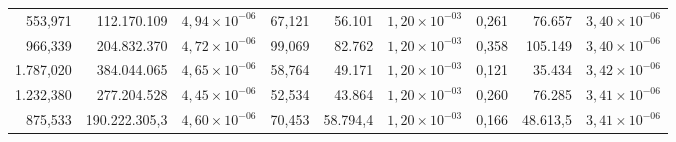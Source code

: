 \begin{table}[h]
\begin{tabular}{r r r r r r r r r}
      553,971 & 112.170.109   & $4,94 {\times} 10^{-06}$ & 67,121 & 56.101   & $1,20 {\times} 10^{-03}$ & 0,261 &  76.657   & $3,40 {\times} 10^{-06}$ \\
      966,339 & 204.832.370   & $4,72 {\times} 10^{-06}$ & 99,069 & 82.762   & $1,20 {\times} 10^{-03}$ & 0,358 & 105.149   & $3,40 {\times} 10^{-06}$ \\
    1.787,020 & 384.044.065   & $4,65 {\times} 10^{-06}$ & 58,764 & 49.171   & $1,20 {\times} 10^{-03}$ & 0,121 &  35.434   & $3,42 {\times} 10^{-06}$ \\
    1.232,380 & 277.204.528   & $4,45 {\times} 10^{-06}$ & 52,534 & 43.864   & $1,20 {\times} 10^{-03}$ & 0,260 &  76.285   & $3,41 {\times} 10^{-06}$ \\ \cmidrule(r){1-3} \cmidrule(lr){4-6} \cmidrule(l){7-9}
      875,533 & 190.222.305,3 & $4,60 {\times} 10^{-06}$ & 70,453 & 58.794,4 & $1,20 {\times} 10^{-03}$ & 0,166 &  48.613,5 & $3,41 {\times} 10^{-06}$ \\ \bottomrule
    \end{tabular}
\end{table}
